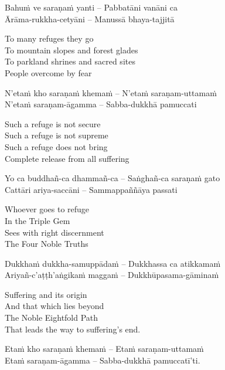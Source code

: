 Bahuṁ ve saraṇaṁ yanti – Pabbatāni vanāni ca\\
Ārāma-rukkha-cetyāni – Manussā bhaya-tajjitā\\

\begin{english-verses}
  To many refuges they go\\
  To mountain slopes and forest glades\\
  To parkland shrines and sacred sites\\
  People overcome by fear
\end{english-verses}

N'etaṁ kho saraṇaṁ khemaṁ – N'etaṁ saraṇam-uttamaṁ\\
N'etaṁ saraṇam-āgamma – Sabba-dukkhā pamuccati\\

\begin{english-verses}
  Such a refuge is not secure\\
  Such a refuge is not supreme\\
  Such a refuge does not bring\\
  Complete release from all suffering
\end{english-verses}

Yo ca buddhañ-ca dhammañ-ca – Saṅghañ-ca saraṇaṁ gato\\
Cattāri ariya-saccāni – Sammappaññāya passati\\

\begin{english-verses}
  Whoever goes to refuge\\
  In the Triple Gem\\
  Sees with right discernment\\
  The Four Noble Truths
\end{english-verses}

Dukkhaṁ dukkha-samuppādaṁ – Dukkhassa ca atikkamaṁ\\
Ariyañ-c'aṭṭh'aṅgikaṁ maggaṁ – Dukkhūpasama-gāminaṁ\\

\begin{english-verses}
  Suffering and its origin\\
  And that which lies beyond\\
  The Noble Eightfold Path\\
  That leads the way to suffering's end.
\end{english-verses}

Etaṁ kho saraṇaṁ khemaṁ – Etaṁ saraṇam-uttamaṁ\\
Etaṁ saraṇam-āgamma – Sabba-dukkhā pamuccatī'ti.

